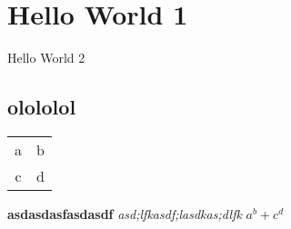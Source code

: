 \documentclass{article}
\begin{document}
\section{Hello World 1}
Hello World 2 
\subsection{olololol}
\begin{tabular}{cc} a & b \\ 
c & d 
\end{tabular}
\textbf{asdasdasfasdasdf}
\emph{asd;lfkasdf;lasdkas;dlfk}
$a^b+c^d$
\end{document}
